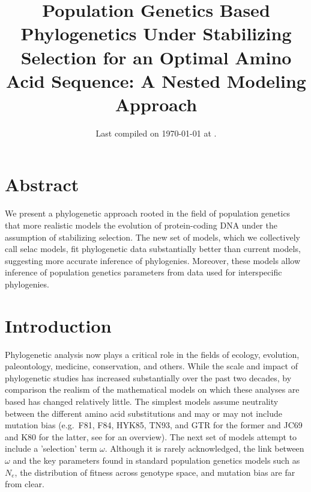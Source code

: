 \documentclass{article}
\title{Population Genetics Based Phylogenetics Under Stabilizing Selection for an Optimal Amino Acid Sequence: A Nested Modeling Approach
} \date{Last compiled on \today\xspace at \currenttime.}
\newcommand{\Ne}{\ensuremath{{N_e}}\xspace} %
\begin{document}
\maketitle


\section*{Abstract}
We present a phylogenetic approach rooted in the field of population genetics that more realistic models the evolution of protein-coding DNA under the assumption of stabilizing selection.
The new set of models, which we collectively call selac models, fit phylogenetic data substantially better than current models, suggesting more accurate inference of phylogenies.
Moreover, these models allow inference of population genetics parameters from data used for interspecific phylogenies.

\section*{Introduction}
Phylogenetic analysis now plays a critical role in the fields of ecology, evolution, paleontology, medicine, conservation, and others.
While the scale and impact of phylogenetic studies has increased substantially over the past two decades, by comparison the realism of the mathematical models on which these analyses are based has changed relatively little.
The simplest models assume neutrality between the different amino acid substitutions and may or may not include mutation bias (e.g.~F81, F84, HYK85, TN93, and GTR for the former and JC69 and K80 for the latter, see \citet{Yang2014} for an overview).
The next set of models attempt to include a 'selection' term $\omega$.
Although it is rarely acknowledged, the link between $\omega$ and the key parameters found in standard population genetics models such as \Ne, the distribution of fitness across genotype space, and mutation bias are far from clear.
\end{document}
